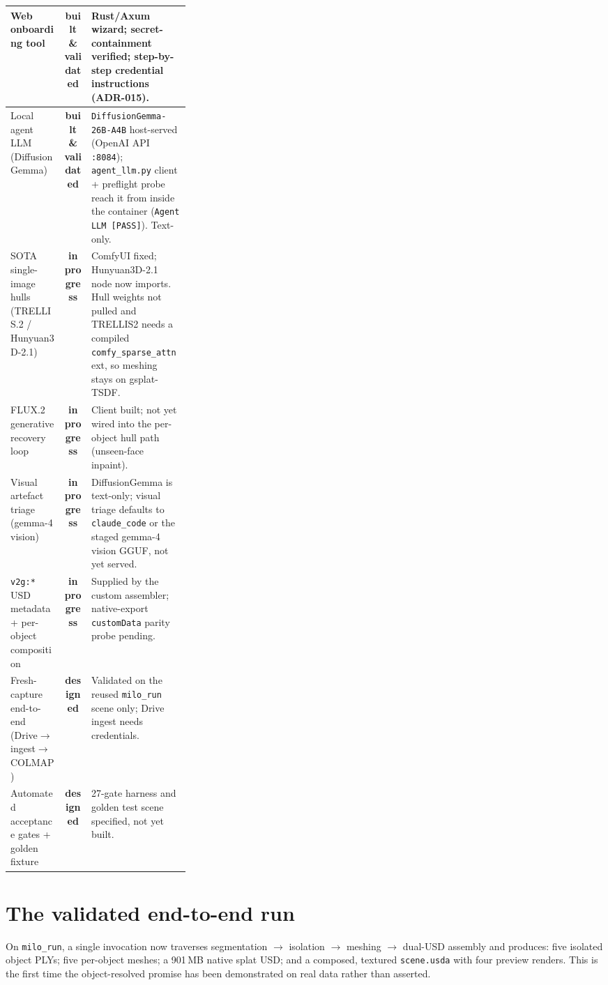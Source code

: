 \documentclass[a4paper,11pt]{report}
\newcommand{\chip}[2]{\textcolor{#1}{\textbf{#2}}}
\newcommand{\code}[1]{\texttt{#1}}
\newcommand{\validated}{\chip{SuccessGreen}{built \& validated}}
\newcommand{\wip}{\chip{WarningAmber}{in progress}}
\newcommand{\designed}{\chip{MidGrey}{designed}}
\begin{document}
\begin{center}
\begin{tabularx}{\linewidth}{@{}L{0.30\linewidth} c X@{}}
Web onboarding tool & \validated{} & Rust/Axum wizard; secret-containment verified; step-by-step credential instructions (ADR-015). \\
\midrule
Local agent LLM (DiffusionGemma) & \validated{} & \code{DiffusionGemma-26B-A4B} host-served (OpenAI API \code{:8084}); \code{agent\_llm.py} client + preflight probe reach it from inside the container (\code{Agent LLM [PASS]}). Text-only. \\
SOTA single-image hulls (TRELLIS.2 / Hunyuan3D-2.1) & \wip{} & ComfyUI fixed; Hunyuan3D-2.1 node now imports. Hull weights not pulled and TRELLIS2 needs a compiled \code{comfy\_sparse\_attn} ext, so meshing stays on gsplat-TSDF. \\
FLUX.2 generative recovery loop & \wip{} & Client built; not yet wired into the per-object hull path (unseen-face inpaint). \\
Visual artefact triage (gemma-4 vision) & \wip{} & DiffusionGemma is text-only; visual triage defaults to \code{claude\_code} or the staged gemma-4 vision GGUF, not yet served. \\
\code{v2g:*} USD metadata + per-object composition & \wip{} & Supplied by the custom assembler; native-export \code{customData} parity probe pending. \\
Fresh-capture end-to-end (Drive$\rightarrow$ingest$\rightarrow$COLMAP) & \designed{} & Validated on the reused \code{milo\_run} scene only; Drive ingest needs credentials. \\
Automated acceptance gates + golden fixture & \designed{} & 27-gate harness and golden test scene specified, not yet built. \\
\bottomrule
\end{tabularx}
\end{center}

\section{The validated end-to-end run}
On \code{milo\_run}, a single invocation now traverses segmentation $\rightarrow$ isolation $\rightarrow$
meshing $\rightarrow$ dual-USD assembly and produces: five isolated object PLYs; five per-object meshes; a
901\,MB native splat USD; and a composed, textured \code{scene.usda} with four preview renders. This is
the first time the object-resolved promise has been demonstrated on real data rather than asserted.
\end{document}

